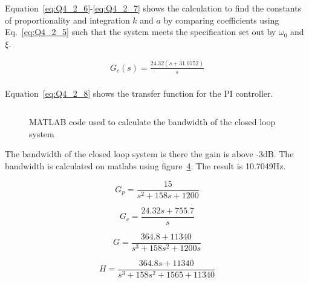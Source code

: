     Equation~\eqref{eq:Q4_2_6}-\eqref{eq:Q4_2_7} shows the calculation to find the constants of proportionality and integration $k$ and $a$ by comparing coefficients using Eq.~\eqref{eq:Q4_2_5} such that the system meets the specification set out by $\omega_0$ and $\xi$.

    \begin{equation}
        \begin{split}
            G_c\left(s\right)=\frac{24.32\left(s+31.0752\right)}{s}\\
        \end{split}\label{eq:Q4_2_8}
    \end{equation}

    Equation~\eqref{eq:Q4_2_8} shows the transfer function for the PI controller.

    \renewcommand{\ex}{Q4_2} 

\begin{figure}[ht!]
    \centering
    
    \caption{\appendixamble{\ex}}
    \label{fig:\ex}
\end{figure}\FloatBarrier

\begin{figure}[ht!]
    \centering
    
    \caption{\appendixamble{\ex}}
    \label{fig:\ex}
\end{figure}\FloatBarrier

\begin{figure}[ht!]
    \centering
    
    
    \caption{\appendixamble{\ex}}
    \label{fig:\ex}
\end{figure}\FloatBarrier

\begin{figure}[ht!]
    \centering
    \inputminted[firstline=58,lastline=58]{matlab}{matlab/Q4_1.m}
    \caption{MATLAB code used to calculate the bandwidth of the closed loop system}\label{fig:Q4code}
\end{figure}\FloatBarrier

The bandwidth of the closed loop system is there the gain is above -3dB. The bandwidth is calculated on matlabs using figure~\ref{fig:Q4code}. The result is 10.7049Hz.

\begin{equation}
    G_{p}= \frac{15}{s^{2}+158s+1200}
\end{equation}

\begin{equation}
    G_{c}=\frac{24.32s+755.7}{s}
\end{equation}

\begin{equation}
    G=\frac{364.8+11340}{s^{3}+158s^{2}+1200s}
\end{equation}

\begin{equation}
    H=\frac{364.8s+11340}{s^{3}+158s^{2}+1565+11340}
\end{equation}
